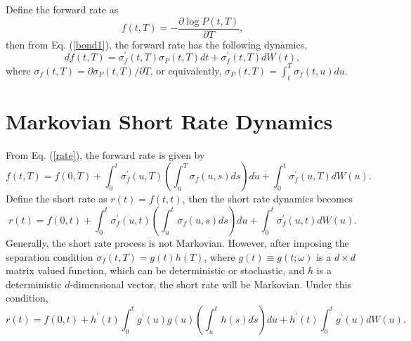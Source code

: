 \documentclass[12pt]{article}
\begin{document}
  Define the forward rate as
  \begin{equation}
    f(t,T)=-\frac{\partial\log P(t,T)}{\partial T},
  \end{equation}
  then from Eq. (\ref{bond1}), the forward rate has the following dynamics,
  \begin{equation}
    \label{rate}
    df(t,T)=\sigma_f^{\prime}(t,T)\sigma_P(t,T)dt+\sigma_f^{\prime}(t,T)dW(t),
  \end{equation}
  where $\sigma_f(t,T)=\partial\sigma_P(t,T)/\partial T$, or equivalently,
  $\sigma_P(t,T)=\int_t^T\sigma_f(t,u)du$.


\section{Markovian Short Rate Dynamics}

  From Eq. (\ref{rate}), the forward rate is given by
  \begin{equation}
    f(t,T)=f(0,T)+\int_0^t\sigma_f^{\prime}(u,T)\left(\int_u^T\sigma_f(u,s)ds\right)du+\int_0^t\sigma_f^{\prime}(u,T)dW(u).
  \end{equation}
  Define the short rate as $r(t)=f(t,t)$, then the short rate dynamics becomes
  \begin{equation}
    r(t)=f(0,t)+\int_0^t\sigma_f^{\prime}(u,t)\left(\int_u^t\sigma_f(u,s)ds\right)du+\int_0^t\sigma_f^{\prime}(u,t)dW(u).
  \end{equation}
  Generally, the short rate process is not Markovian. However, after imposing the separation condition
  $\sigma_f(t,T)=g(t)h(T)$, where $g(t)\equiv g(t;\omega)$ is a $d\times d$ matrix valued function, which can
  be deterministic or stochastic, and $h$ is a
  deterministic $d$-dimensional vector, the short rate will be Markovian. Under this condition,
  \begin{equation}
    r(t)=f(0,t)+h^{\prime}(t)\int_0^tg^{\prime}(u)g(u)\left(\int_u^th(s)ds\right)du+h^{\prime}(t)\int_0^tg^{\prime}(u)dW(u).
  \end{equation}
  
\end{document}
